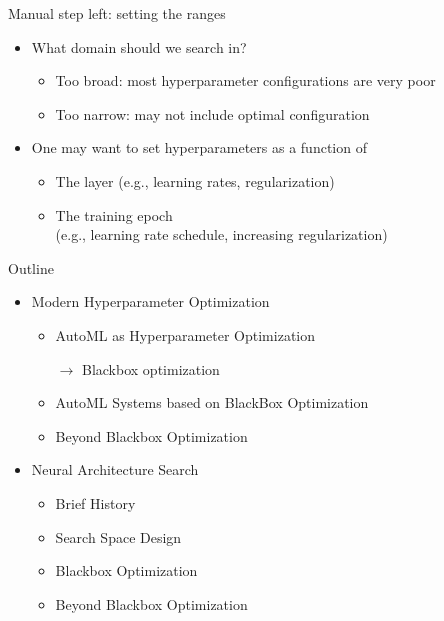 \begin{frame}[c]{Manual step left: setting the ranges}
\begin{itemize}
	\item What domain should we search in?
	\begin{itemize}
		\item Too broad: most hyperparameter configurations are very poor
		\item Too narrow: may not include optimal configuration
	\end{itemize}
	\item One may want to set hyperparameters as a function of
	\begin{itemize}
		\item The layer (e.g., learning rates, regularization)
		\item The training epoch\\
		(e.g., learning rate schedule, increasing regularization)
	\end{itemize}
\end{itemize}
\end{frame}
\begin{frame}[c]{Outline}
\begin{itemize}
	\item Modern Hyperparameter Optimization
	\begin{itemize}
		\item AutoML as Hyperparameter Optimization
		\item[$\to$] Blackbox optimization
		\item AutoML Systems based on BlackBox Optimization
		\item Beyond Blackbox Optimization 
	\end{itemize}
	\item Neural Architecture Search
	\begin{itemize}
		\item Brief History
		\item Search Space Design
		\item Blackbox Optimization
		\item Beyond Blackbox Optimization
	\end{itemize}
\end{itemize}
\end{frame}
